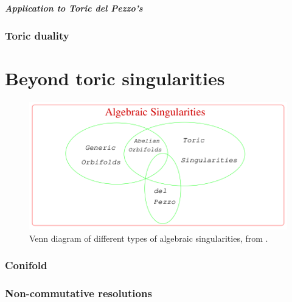         \subsubsection{Application to Toric del Pezzo's}

\section{Toric duality}

\part{Beyond toric singularities}

    \begin{figure}[H]
        \centering
        \includegraphics[scale=0.3]{Pictures/algebraicsingularities.png}
        \caption{Venn diagram of different types of algebraic singularities, from \cite{he2004lectures}.}
    \end{figure}

\section{Conifold}

\section{Non-commutative resolutions}


